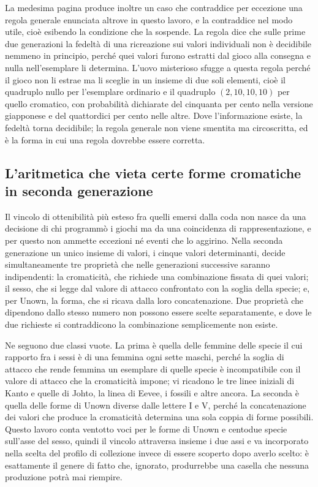 La medesima pagina produce inoltre un caso che contraddice per eccezione una regola generale enunciata altrove in questo lavoro, e la contraddice nel modo utile, cioè esibendo la condizione che la sospende. La regola dice che sulle prime due generazioni la fedeltà di una ricreazione sui valori individuali non è decidibile nemmeno in principio, perché quei valori furono estratti dal gioco alla consegna e nulla nell'esemplare li determina. L'uovo misterioso sfugge a questa regola perché il gioco non li estrae ma li sceglie in un insieme di due soli elementi, cioè il quadruplo nullo per l'esemplare ordinario e il quadruplo $(2,10,10,10)$ per quello cromatico, con probabilità dichiarate del cinquanta per cento nella versione giapponese e del quattordici per cento nelle altre. Dove l'informazione esiste, la fedeltà torna decidibile; la regola generale non viene smentita ma circoscritta, ed è la forma in cui una regola dovrebbe essere corretta.

\subsection{L'aritmetica che vieta certe forme cromatiche in seconda generazione}

Il vincolo di ottenibilità più esteso fra quelli emersi dalla coda non nasce da una decisione di chi programmò i giochi ma da una coincidenza di rappresentazione, e per questo non ammette eccezioni né eventi che lo aggirino. Nella seconda generazione un unico insieme di valori, i cinque valori determinanti, decide simultaneamente tre proprietà che nelle generazioni successive saranno indipendenti: la cromaticità, che richiede una combinazione fissata di quei valori; il sesso, che si legge dal valore di attacco confrontato con la soglia della specie; e, per Unown, la forma, che si ricava dalla loro concatenazione. Due proprietà che dipendono dallo stesso numero non possono essere scelte separatamente, e dove le due richieste si contraddicono la combinazione semplicemente non esiste.

Ne seguono due classi vuote. La prima è quella delle femmine delle specie il cui rapporto fra i sessi è di una femmina ogni sette maschi, perché la soglia di attacco che rende femmina un esemplare di quelle specie è incompatibile con il valore di attacco che la cromaticità impone; vi ricadono le tre linee iniziali di Kanto e quelle di Johto, la linea di Eevee, i fossili e altre ancora. La seconda è quella delle forme di Unown diverse dalle lettere I e V, perché la concatenazione dei valori che produce la cromaticità determina una sola coppia di forme possibili. Questo lavoro conta ventotto voci per le forme di Unown e centodue specie sull'asse del sesso, quindi il vincolo attraversa insieme i due assi e va incorporato nella scelta del profilo di collezione invece di essere scoperto dopo averlo scelto: è esattamente il genere di fatto che, ignorato, produrrebbe una casella che nessuna produzione potrà mai riempire.

